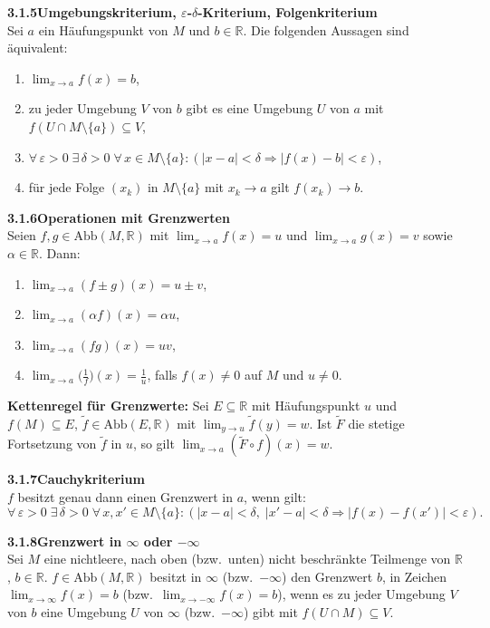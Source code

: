 \documentclass[a4paper,12pt]{article}
\newcommand{\gentry}[3]{%
  \noindent\textbf{#1\quad #2}\nopagebreak\\[0.2em]
  #3\par\smallskip
}
\begin{document}
\gentry{3.1.5}{Umgebungskriterium, $\varepsilon$-$\delta$-Kriterium, Folgenkriterium}{%
  Sei $a$ ein H\"aufungspunkt von $M$ und $b \in \mathbb{R}$. Die folgenden
  Aussagen sind \"aquivalent:
  \begin{enumerate}[label=(\roman*),topsep=2pt,itemsep=1pt]
    \item $\lim_{x \to a} f(x) = b$,
    \item zu jeder Umgebung $V$ von $b$ gibt es eine Umgebung $U$ von $a$ mit
          $f(U \cap M \setminus \{a\}) \subseteq V$,
    \item $\forall\, \varepsilon > 0 \; \exists\, \delta > 0 \; \forall\, x \in M \setminus \{a\}:
          (|x - a| < \delta \Rightarrow |f(x) - b| < \varepsilon)$,
    \item f\"ur jede Folge $(x_k)$ in $M \setminus \{a\}$ mit $x_k \to a$ gilt $f(x_k) \to b$.
  \end{enumerate}
}

\gentry{3.1.6}{Operationen mit Grenzwerten}{%
  Seien $f, g \in \mathrm{Abb}(M, \mathbb{R})$ mit $\lim_{x \to a} f(x) = u$ und
  $\lim_{x \to a} g(x) = v$ sowie $\alpha \in \mathbb{R}$. Dann:
  \begin{enumerate}[label=(\roman*),topsep=2pt,itemsep=1pt]
    \item $\lim_{x \to a}(f \pm g)(x) = u \pm v$,
    \item $\lim_{x \to a}(\alpha f)(x) = \alpha u$,
    \item $\lim_{x \to a}(f g)(x) = u v$,
    \item $\lim_{x \to a}\bigl(\tfrac{1}{f}\bigr)(x) = \tfrac{1}{u}$, falls $f(x) \neq 0$ auf $M$ und $u \neq 0$.
  \end{enumerate}
  \textbf{Kettenregel f\"ur Grenzwerte:} Sei $E \subseteq \mathbb{R}$ mit H\"aufungspunkt $u$ und
  $f(M) \subseteq E$, $\tilde f \in \mathrm{Abb}(E, \mathbb{R})$ mit $\lim_{y \to u} \tilde f(y) = w$.
  Ist $\tilde F$ die stetige Fortsetzung von $\tilde f$ in $u$, so gilt
  $\lim_{x \to a}(\tilde F \circ f)(x) = w$.
}

\gentry{3.1.7}{Cauchykriterium}{%
  $f$ besitzt genau dann einen Grenzwert in $a$, wenn gilt:
  \[
    \forall\, \varepsilon > 0 \; \exists\, \delta > 0 \; \forall\, x, x' \in M \setminus \{a\}:
    (|x - a| < \delta,\; |x' - a| < \delta \Rightarrow |f(x) - f(x')| < \varepsilon).
  \]
}

\gentry{3.1.8}{Grenzwert in $\infty$ oder $-\infty$}{%
  Sei $M$ eine nichtleere, nach oben (bzw.\ unten) nicht beschr\"ankte Teilmenge von
  $\mathbb{R}$, $b \in \mathbb{R}$. $f \in \mathrm{Abb}(M, \mathbb{R})$ besitzt in
  $\infty$ (bzw.\ $-\infty$) den Grenzwert $b$, in Zeichen
  $\lim_{x \to \infty} f(x) = b$ (bzw.\ $\lim_{x \to -\infty} f(x) = b$), wenn es
  zu jeder Umgebung $V$ von $b$ eine Umgebung $U$ von $\infty$ (bzw.\ $-\infty$) gibt mit
  $f(U \cap M) \subseteq V$.
}
\end{document}
